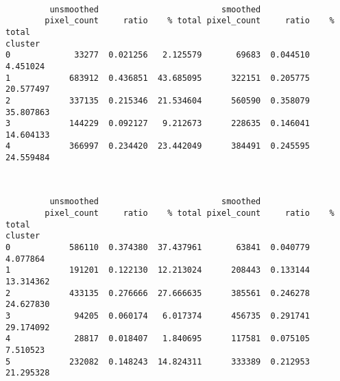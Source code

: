 \documentclass[11pt]{article}
\begin{document}
    
    \begin{center}
    \end{center}
    { \hspace*{\fill} \\}
    
    
    \begin{verbatim}
         unsmoothed                         smoothed                     
        pixel_count     ratio    % total pixel_count     ratio    % total
cluster                                                                  
0             33277  0.021256   2.125579       69683  0.044510   4.451024
1            683912  0.436851  43.685095      322151  0.205775  20.577497
2            337135  0.215346  21.534604      560590  0.358079  35.807863
3            144229  0.092127   9.212673      228635  0.146041  14.604133
4            366997  0.234420  23.442049      384491  0.245595  24.559484
    \end{verbatim}

    
    \begin{center}
    \end{center}
    { \hspace*{\fill} \\}
    
    
    \begin{verbatim}
         unsmoothed                         smoothed                     
        pixel_count     ratio    % total pixel_count     ratio    % total
cluster                                                                  
0            586110  0.374380  37.437961       63841  0.040779   4.077864
1            191201  0.122130  12.213024      208443  0.133144  13.314362
2            433135  0.276666  27.666635      385561  0.246278  24.627830
3             94205  0.060174   6.017374      456735  0.291741  29.174092
4             28817  0.018407   1.840695      117581  0.075105   7.510523
5            232082  0.148243  14.824311      333389  0.212953  21.295328
    \end{verbatim}

    
    \begin{center}
    \end{center}
    { \hspace*{\fill} \\}
    
\end{document}
